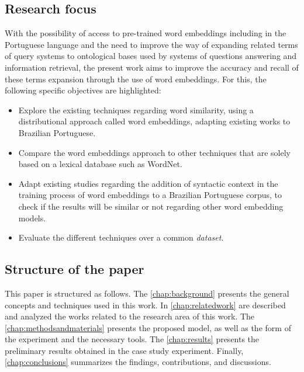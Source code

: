 
\subsection{Research focus}

With the possibility of access to pre-trained word embeddings including in the Portuguese language and the need to improve the way of expanding related terms of query systems to ontological bases used by systems of questions answering and information retrieval, the present work aims to improve the accuracy and recall of these terms expansion through the use of word embeddings. For this, the following specific objectives are highlighted:

\begin{itemize}
    \item Explore the existing techniques regarding word similarity, using a distributional approach called word embeddings, adapting existing works to Brazilian Portuguese.
    \item Compare the word embeddings approach to other techniques that are solely based on a lexical database such as WordNet.
    \item Adapt existing studies regarding the addition of syntactic context in the training process of word embeddings to a Brazilian Portuguese corpus, to check if the results will be similar or not regarding other word embedding models. 
    \item Evaluate the different techniques over a common \textit{dataset}.
\end{itemize}

\subsection{Structure of the paper}

This paper is structured as follows. The \autoref{chap:background} presents the general concepts and techniques used in this work. In \autoref{chap:relatedwork} are described and analyzed the works related to the research area of this work. The \autoref{chap:methodsandmaterials} presents the proposed model, as well as the form of the experiment and the necessary tools. 
The \autoref{chap:results} presents the preliminary results obtained in the case study experiment. 
Finally, \autoref{chap:conclusions} summarizes the findings, contributions, and discussions.


